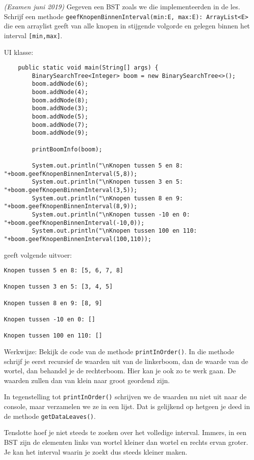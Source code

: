 \begin{oef}
\code \emph{(Examen juni 2019)} Gegeven een BST zoals we die implementeerden in de les. Schrijf een methode \verb+geefKnopenBinnenInterval(min:E, max:E): ArrayList<E>+ die een arraylist geeft van alle knopen in stijgende volgorde en gelegen binnen het interval \verb+[min,max]+. 

UI klasse:
\begin{lstlisting}
    public static void main(String[] args) {
        BinarySearchTree<Integer> boom = new BinarySearchTree<>();
        boom.addNode(6);
        boom.addNode(4);
        boom.addNode(8);
        boom.addNode(3);
        boom.addNode(5);
        boom.addNode(7);
        boom.addNode(9);

        printBoomInfo(boom);

        System.out.println("\nKnopen tussen 5 en 8: "+boom.geefKnopenBinnenInterval(5,8));
        System.out.println("\nKnopen tussen 3 en 5: "+boom.geefKnopenBinnenInterval(3,5));
        System.out.println("\nKnopen tussen 8 en 9: "+boom.geefKnopenBinnenInterval(8,9));
        System.out.println("\nKnopen tussen -10 en 0: "+boom.geefKnopenBinnenInterval(-10,0));
        System.out.println("\nKnopen tussen 100 en 110: "+boom.geefKnopenBinnenInterval(100,110));
\end{lstlisting}
geeft volgende uitvoer:
\begin{lstlisting}
Knopen tussen 5 en 8: [5, 6, 7, 8]

Knopen tussen 3 en 5: [3, 4, 5]

Knopen tussen 8 en 9: [8, 9]

Knopen tussen -10 en 0: []

Knopen tussen 100 en 110: []
\end{lstlisting}
\begin{opl}
Werkwijze: Bekijk de code van de methode \verb/printInOrder()/. In die methode schrijf je eerst recursief de waarden uit van de linkerboom, dan de waarde van de wortel, dan behandel je de rechterboom. Hier kan je ook zo te werk gaan. De waarden zullen dan van klein naar groot geordend zijn. 

In tegenstelling tot \verb/printInOrder()/ schrijven we de waarden nu niet uit naar de console, maar verzamelen we ze in een lijst. Dat is gelijkend op hetgeen je deed in de methode \verb/getDataLeaves()/. 

Tenslotte hoef je niet steeds te zoeken over het volledige interval. Immers, in een BST zijn de elementen links van wortel kleiner dan wortel en rechts ervan groter. Je kan het interval waarin je zoekt dus steeds kleiner maken.


\end{opl}
\end{oef}
